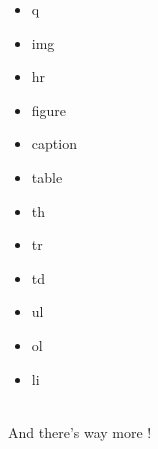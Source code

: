 \documentclass{article}
\begin{document}
\begin{minipage}[c]{0.25\textwidth}
    \begin{itemize}[label = $\bullet$]
        \item q
        \item img
        \item hr
        \item figure
    \end{itemize}
\end{minipage}
\begin{minipage}[c]{0.25\textwidth}
    \begin{itemize}[label = $\bullet$]
        \item caption
        \item table
        \item th
        \item tr
    \end{itemize}
\end{minipage}
\begin{minipage}[c]{0.25\textwidth}
    \begin{itemize}[label = $\bullet$]
        \item td
        \item ul
        \item ol
        \item li
    \end{itemize}
\end{minipage}
\vspace{0.3cm} \\
And there's way more !
\end{document}
